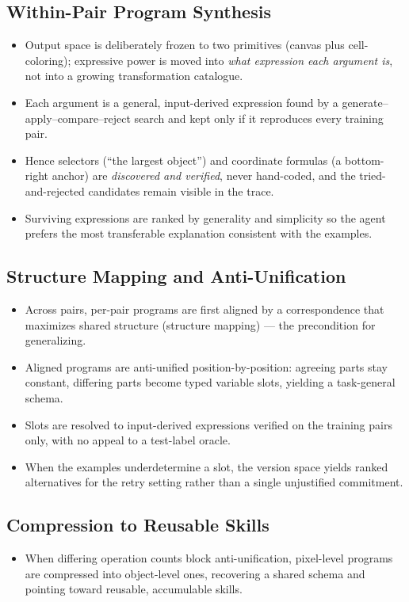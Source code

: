 \documentclass[letterpaper]{article} %
\begin{document}
\subsection{Within-Pair Program Synthesis}
\begin{itemize}
\item Output space is deliberately frozen to two primitives (canvas plus
cell-coloring); expressive power is moved into \emph{what expression each
argument is}, not into a growing transformation catalogue.
\item Each argument is a general, input-derived expression found by a
generate--apply--compare--reject search and kept only if it reproduces every
training pair.
\item Hence selectors (``the largest object'') and coordinate formulas
(a bottom-right anchor) are \emph{discovered and verified}, never hand-coded, and
the tried-and-rejected candidates remain visible in the trace.
\item Surviving expressions are ranked by generality and simplicity so the agent
prefers the most transferable explanation consistent with the examples.
\end{itemize}

\subsection{Structure Mapping and Anti-Unification}
\begin{itemize}
\item Across pairs, per-pair programs are first aligned by a correspondence that
maximizes shared structure (structure mapping) --- the precondition for
generalizing.
\item Aligned programs are anti-unified position-by-position: agreeing parts stay
constant, differing parts become typed variable slots, yielding a task-general
schema.
\item Slots are resolved to input-derived expressions verified on the training
pairs only, with no appeal to a test-label oracle.
\item When the examples underdetermine a slot, the version space yields ranked
alternatives for the retry setting rather than a single unjustified commitment.
\end{itemize}

\subsection{Compression to Reusable Skills}
\begin{itemize}
\item When differing operation counts block anti-unification, pixel-level
programs are compressed into object-level ones, recovering a shared schema and
pointing toward reusable, accumulable skills.
\end{itemize}
\end{document}
